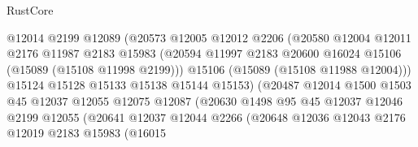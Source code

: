\begin{lexlean}{RustCore}
\begin{coremodule}
                                  @12014
                                  @2199
                                  @12089
                                  (@20573
                                    @12005
                                    @12012
                                    @2206
                                    (@20580
                                      @12004
                                      @12011
                                      @2176
                                      @11987
                                      @2183
                                      @15983
                                      (@20594
                                        @11997
                                        @2183
                                        @20600
                                        @16024
                                        @15106
                                        (@15089 (@15108 @11998 @2199)))
                                      @15106
                                      (@15089 (@15108 @11988 @12004)))
                                    @15124
                                    @15128
                                    @15133
                                    @15138
                                    @15144
                                    @15153)
                                  (@20487
                                    @12014
                                    @1500
                                    @1503
                                    @45
                                    @12037
                                    @12055
                                    @12075
                                    @12087
                                    (@20630
                                      @1498
                                      @95
                                      @45
                                      @12037
                                      @12046
                                      @2199
                                      @12055
                                      (@20641
                                        @12037
                                        @12044
                                        @2266
                                        (@20648
                                          @12036
                                          @12043
                                          @2176
                                          @12019
                                          @2183
                                          @15983
                                          (@16015

\end{coremodule}
\end{lexlean}

